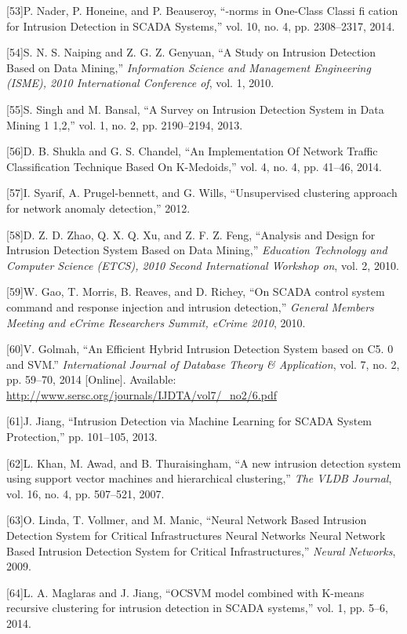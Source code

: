 \documentclass[11pt,]{article}
\begin{document}
{[}53{]}P. Nader, P. Honeine, and P. Beauseroy, ``-norms in One-Class
Classi fi cation for Intrusion Detection in SCADA Systems,'' vol. 10,
no. 4, pp. 2308--2317, 2014.

{[}54{]}S. N. S. Naiping and Z. G. Z. Genyuan, ``A Study on Intrusion
Detection Based on Data Mining,'' \emph{Information Science and
Management Engineering (ISME), 2010 International Conference of}, vol.
1, 2010.

{[}55{]}S. Singh and M. Bansal, ``A Survey on Intrusion Detection System
in Data Mining 1 1,2,'' vol. 1, no. 2, pp. 2190--2194, 2013.

{[}56{]}D. B. Shukla and G. S. Chandel, ``An Implementation Of Network
Traffic Classification Technique Based On K-Medoids,'' vol. 4, no. 4,
pp. 41--46, 2014.

{[}57{]}I. Syarif, A. Prugel-bennett, and G. Wills, ``Unsupervised
clustering approach for network anomaly detection,'' 2012.

{[}58{]}D. Z. D. Zhao, Q. X. Q. Xu, and Z. F. Z. Feng, ``Analysis and
Design for Intrusion Detection System Based on Data Mining,''
\emph{Education Technology and Computer Science (ETCS), 2010 Second
International Workshop on}, vol. 2, 2010.

{[}59{]}W. Gao, T. Morris, B. Reaves, and D. Richey, ``On SCADA control
system command and response injection and intrusion detection,''
\emph{General Members Meeting and eCrime Researchers Summit, eCrime
2010}, 2010.

{[}60{]}V. Golmah, ``An Efficient Hybrid Intrusion Detection System
based on C5. 0 and SVM.'' \emph{International Journal of Database Theory
\& Application}, vol. 7, no. 2, pp. 59--70, 2014 {[}Online{]}.
Available: \url{http://www.sersc.org/journals/IJDTA/vol7/_no2/6.pdf}

{[}61{]}J. Jiang, ``Intrusion Detection via Machine Learning for SCADA
System Protection,'' pp. 101--105, 2013.

{[}62{]}L. Khan, M. Awad, and B. Thuraisingham, ``A new intrusion
detection system using support vector machines and hierarchical
clustering,'' \emph{The VLDB Journal}, vol. 16, no. 4, pp. 507--521,
2007.

{[}63{]}O. Linda, T. Vollmer, and M. Manic, ``Neural Network Based
Intrusion Detection System for Critical Infrastructures Neural Networks
Neural Network Based Intrusion Detection System for Critical
Infrastructures,'' \emph{Neural Networks}, 2009.

{[}64{]}L. A. Maglaras and J. Jiang, ``OCSVM model combined with K-means
recursive clustering for intrusion detection in SCADA systems,'' vol. 1,
pp. 5--6, 2014.
\end{document}
